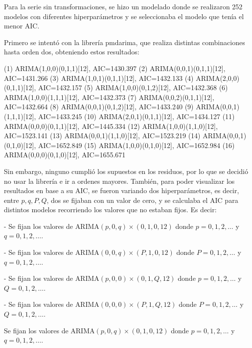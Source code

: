 \documentclass[12pt,letterpaper]{article}   %
\begin{document}
Para la serie sin transformaciones, se hizo un modelado donde se realizaron 252 modelos con diferentes hiperparámetros y se seleccionaba el modelo que tenía el menor AIC.

Primero se intentó con la librería pmdarima, que realiza distintas combinaciones hasta orden dos, obteniendo estos resultados:
\begin{smallconsole}[caption={Modelos con pmdarima}]
(1)  ARIMA(1,0,0)(0,1,1)[12], AIC=1430.397
(2)  ARIMA(0,0,1)(0,1,1)[12], AIC=1431.266
(3)  ARIMA(1,0,1)(0,1,1)[12], AIC=1432.133
(4)  ARIMA(2,0,0)(0,1,1)[12], AIC=1432.157
(5)  ARIMA(1,0,0)(0,1,2)[12], AIC=1432.368
(6)  ARIMA(1,0,0)(1,1,1)[12], AIC=1432.373
(7)  ARIMA(0,0,2)(0,1,1)[12], AIC=1432.664
(8)  ARIMA(0,0,1)(0,1,2)[12], AIC=1433.240
(9)  ARIMA(0,0,1)(1,1,1)[12], AIC=1433.245
(10) ARIMA(2,0,1)(0,1,1)[12], AIC=1434.127
(11) ARIMA(0,0,0)(0,1,1)[12], AIC=1445.334
(12) ARIMA(1,0,0)(1,1,0)[12], AIC=1523.141
(13) ARIMA(0,0,1)(1,1,0)[12], AIC=1523.219
(14) ARIMA(0,0,1)(0,1,0)[12], AIC=1652.849
(15) ARIMA(1,0,0)(0,1,0)[12], AIC=1652.984
(16) ARIMA(0,0,0)(0,1,0)[12], AIC=1655.671
\end{smallconsole}

Sin embargo, ninguno cumplió los supuestos en los residuos, por lo que se decidió no usar la librería e ir a ordenes mayores. También, para poder visualizar los resultados en base a su AIC, se fueron variando dos hiperparámetros, es decir, entre $p, q, P, Q$, dos se fijaban con un valor de cero, y se calculaba el AIC para distintos modelos recorriendo los valores que no estaban fijos. Es decir:

- Se fijan los valores de $\text{ARIMA}(p, 0, q) \times (0, 1, 0, 12)$ donde $p = 0, 1, 2, \dots$ y $q = 0, 1, 2, \dots$.  

- Se fijan los valores de $\text{ARIMA}(0, 0, q) \times (P, 1, 0, 12)$ donde $P = 0, 1, 2, \dots$ y $q = 0, 1, 2, \dots$.  

- Se fijan los valores de $\text{ARIMA}(p, 0, 0) \times (0, 1, Q, 12)$ donde $p = 0, 1, 2, \dots$ y $Q = 0, 1, 2, \dots$.  

- Se fijan los valores de $\text{ARIMA}(0, 0, 0) \times (P, 1, Q, 12)$ donde $P = 0, 1, 2, \dots$ y $Q = 0, 1, 2, \dots$.



\newpage
Se fijan los valores de $\text{ARIMA}(p, 0, q) \times (0, 1, 0, 12)$ donde $p = 0, 1, 2, \dots$ y $q = 0, 1, 2, \dots$.
\end{document}
